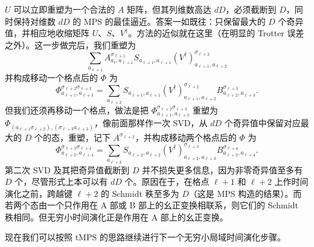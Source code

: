 \documentclass[a4paper,10pt,oneside,onecolumn,1p,times]{elsarticle}
\begin{document}
$U$ 可以立即重塑为一个合法的 $A$ 矩阵，但其列维数高达 $dD$，必须截断到 $D$，同时保持对维数 $dD$ 的 MPS 的最佳逼近。答案一如既往：只保留最大的 $D$ 个奇异值，并相应地收缩矩阵 $U$、$S$、$V^\dagger$。方法的近似就在这里（在明显的 Trotter 误差之外）。这一步做完后，我们重塑为
\begin{equation}
\sum_{a_{\ell+1}} A^{\sigma_{\ell+1}}_{a_\ell, a_{\ell+1}}  S_{a_{\ell+1},a_{\ell+1}} (V^\dagger)^{\sigma_{\ell+2}}_{a_{\ell+1},  a_{\ell+2}}
\end{equation}
并构成移动一个格点后的 $\Phi$ 为
\begin{equation}
\Phi^{\sigma_{\ell+2}\sigma_{\ell+3}}_{a_{\ell+1},a_{\ell+3}} = \sum_{a_{\ell+2}} S_{a_{\ell+1},a_{\ell+1}} (V^\dagger)^{\sigma_{\ell+2}}_{a_{\ell+1},  a_{\ell+2}} B^{\sigma_{\ell+3}}_{a_{\ell+2},  a_{\ell+3}} .
\end{equation}
但我们还须再移动一个格点，做法是把 $\Phi^{\sigma_{\ell+2}\sigma_{\ell+3}}_{a_{\ell+1},a_{\ell+3}}$ 重塑为 $\Phi_{(a_{\ell+1}\sigma_{\ell+2}),(\sigma_{\ell+3} a_{\ell+3})}$，像前面那样作一次 SVD，从 $dD$ 个奇异值中保留对应最大的 $D$ 个的态，重塑，记下 $A^{\sigma_{\ell+2}}$，并构成移动两个格点后的 $\Phi$ 为
\begin{equation}
\Phi^{\sigma_{\ell+3}\sigma_{\ell+4}}_{a_{\ell+2},a_{\ell+4}} = \sum_{a_{\ell+3}} S_{a_{\ell+2},a_{\ell+2}} (V^\dagger)^{\sigma_{\ell+3}}_{a_{\ell+2},  a_{\ell+3}} B^{\sigma_{\ell+4}}_{a_{\ell+3},  a_{\ell+4}} .
\end{equation}
第二次 SVD 及其把奇异值截断到 $D$ 并不损失更多信息，因为非零奇异值至多有 $D$ 个，尽管形式上本可以有 $dD$ 个。原因在于，在格点 $\ell+1$ 和 $\ell+2$ 上作时间演化之前，跨越键 $\ell+2$ 的 Schmidt 秩至多为 $D$（这是 MPS 构造的结果）。而若两个态由一个只作用在 A 部或 B 部上的幺正变换相联系，则它们的 Schmidt 秩相同。但无穷小时间演化正是作用在 A 部上的幺正变换。

现在我们可以按照 tMPS 的思路继续进行下一个无穷小局域时间演化步骤。   
\end{document}
